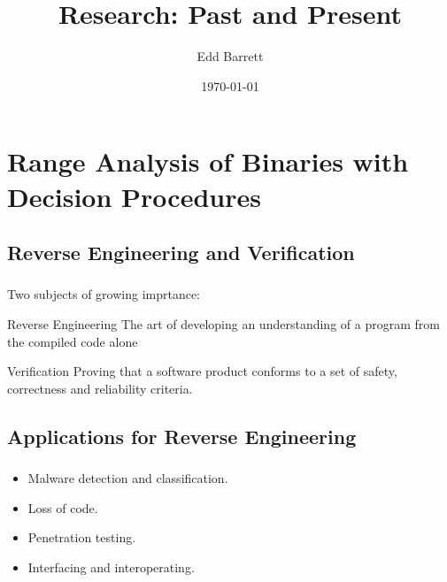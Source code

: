 \documentclass[compress]{beamer}
\title{Research: Past and Present}
\author{Edd Barrett}
\date{\today}
\institute{%
	Software Development Team\\
	King's College London, England
}
\begin{document}
\begin{frame}
  \titlepage
\end{frame}

\section{Range Analysis of Binaries with Decision Procedures}

\begin{frame}
  \sectionpage
\end{frame}

\subsection{Reverse Engineering and Verification}

\begin{frame}[fragile]
	\frametitle{\insertsubsection}

	Two subjects of growing imprtance:
	\vfill
	\begin{block}{Reverse Engineering}
                The art of developing an understanding of a program from
                the compiled code alone
	\end{block}
	\vfill
	\begin{block}{Verification}
                Proving that a software product conforms to a set of
                safety, correctness and reliability criteria.
	\end{block}

\end{frame}


\subsection{Applications for Reverse Engineering}
\begin{frame}[fragile]
	\frametitle{\insertsubsection}

	\begin{itemize}
		\vfill
	\item Malware detection and classification.
		\vfill
	\item Loss of code.
		\vfill
	\item Penetration testing.
		\vfill
	\item Interfacing and interoperating.
		\vfill
	\end{itemize}

\end{frame}
\end{document}
